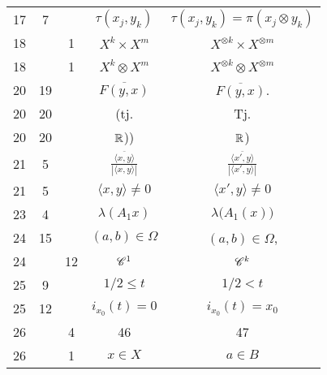 \documentclass[a4paper,11pt]{article}
\begin{document}
\begin{center}
\begin{tabular}{|c|c|c|c|c|}
    17  &  7 & & $\tau( x_{ j }, y_{ k } )$
           & $\tau( x_{ j }, y_{ k } ) = \pi( x_{ j } \otimes y_{ k } )$ \\
    18  & &  1 & $X^{ k } \times X^{ m }$ & $X^{ \otimes k } \times X^{ \otimes m }$ \\
    18  & &  1 & $X^{ k } \otimes X^{ m }$ & $X^{ \otimes k } \otimes X^{ \otimes m }$ \\
    20  & 19 & & $\overline{ F( y, x ) }$ & $\overline{ F( y, x ) }$. \\
    20  & 20 & & (tj. & Tj. \\
    20  & 20 & & $\mathbb{R}$)) & $\mathbb{R}$) \\[0.3em]
    21  &  5 & & $\displaystyle
                 \frac{ \overline{ \langle x, y \rangle } }{ | \langle x, y \rangle | }$
           & $\displaystyle
             \frac{ \overline{ \langle x', y \rangle } }{ | \langle x', y \rangle | }$ \\
    21  &  5 & & $\langle x, y \rangle \neq 0$ & $\langle x', y \rangle \neq 0$ \\
    23  &  4 & & $\lambda ( A_{ 1 } x )$ & $\lambda \big( A_{ 1 }( x ) \big)$ \\
    24  & 15 & & $( a, b ) \in \Omega$ & $( a, b ) \in \Omega$, \\
    24  & & 12 & $\mathcal{C}^{ 1 }$ & $\mathcal{C}^{ k }$ \\
    25  &  9 & & $1 / 2 \leq t$ & $1 / 2 < t$ \\
    25  & 12 & & $i_{ x_{ 0 } }( t ) = 0$ & $i_{ x_{ 0 } }( t ) = x_{ 0 }$ \\
    26  & &  4 & 46 & 47 \\
    26  & &  1 & $x \in X$ & $a \in B$ \\
    \hline
  \end{tabular}





  \newpage


\end{center}
\end{document}
